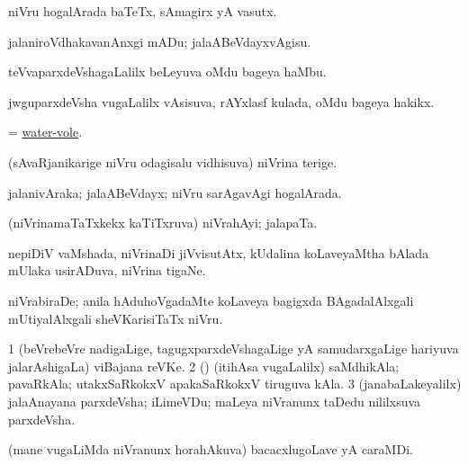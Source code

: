 \bentry
{} 
\gl{\nA}
\expl{}
\bmng
niVru hogalArada baTeTx, sAmagirx yA vasutx. 
\emng
\eentry

\bentry
{} 
\gl{\sakirx}
\expl{}
\bmng
jalaniroVdhakavanAnxgi mADu; jalaABeVdayxvAgisu. 
\emng
\eentry

\bentry
{} 
\gl{\nA}
\expl{}
\bmng
teVvaparxdeVshagaLalilx beLeyuva oMdu bageya haMbu. 
\emng
\eentry

\bentry
{} 
\gl{\nA}
\expl{}
\bmng
jwguparxdeVsha \mo vugaLalilx vAsisuva, rAYxlasf kulada, oMdu bageya hakikx. 
\emng
\eentry

\bentry
{} 
\gl{\nA}
\expl{}
\bmng
= \hyperlink{water-vole}{water-vole}. 
\emng
\eentry

\bentry
{} 
\gl{\nA}
\expl{}
\bmng
(sAvaRjanikarige niVru odagisalu vidhisuva) niVrina terige. 
\emng
\eentry

\bentry
{} 
\gl{\gu}
\expl{}
\bmng
jalanivAraka; jalaABeVdayx; niVru sarAgavAgi hogalArada. 
\emng
\eentry

\bentry
{} 
\gl{\nA}
\expl{}
\bmng
(niVrinamaTaTxkekx kaTiTxruva) niVrahAyi; jalapaTa. 
\emng
\eentry

\bentry
{} 
\gl{\nA}
\expl{}
\bmng
nepiDiV vaMshada, niVrinaDi jiVvisutAtx, kUdalina koLaveyaMtha bAlada mUlaka usirADuva, niVrina tigaNe. 
\emng
\eentry

\bentry
{} 
\gl{\nA}
\expl{}
\bmng
niVrabiraDe; anila hAduhoVgadaMte koLaveya bagigxda BAgadalAlxgali mUtiyalAlxgali sheVKarisiTaTx niVru. 
\emng
\eentry

\bentry
{} 
\gl{\nA}
\expl{}
\bmng
\bnum
\num{1} (beVrebeVre nadigaLige, tagugxparxdeVshagaLige yA samudarxgaLige hariyuva jalarAshigaLa) viBajana reVKe. 
\num{2} (\rUpa) (itihAsa \mo vugaLalilx) saMdhikAla; pavaRkAla; utakxSaRkokxV apakaSaRkokxV tiruguva kAla. 
\num{3} (janabaLakeyalilx) jalaAnayana parxdeVsha; iLimeVDu; maLeya niVranunx taDedu nililxsuva parxdeVsha. 
\enum
\emng
\eentry

\bentry
{} 
\gl{\nA}
\expl{}
\bmng
(mane \mo vugaLiMda niVranunx horahAkuva) bacacxlugoLave yA caraMDi. 
\emng
\eentry

